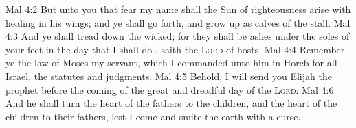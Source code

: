 \vs Mal 4:2 But unto you that fear my name shall the Sun of righteousness arise with healing in his wings; and ye shall go forth, and grow up as calves of the stall.
\vs Mal 4:3 And ye shall tread down the wicked; for they shall be ashes under the soles of your feet in the day that I shall do , saith the \textsc{Lord} of hosts.
\vs Mal 4:4 Remember ye the law of Moses my servant, which I commanded unto him in Horeb for all Israel,  the statutes and judgments.
\vs Mal 4:5 Behold, I will send you Elijah the prophet before the coming of the great and dreadful day of the \textsc{Lord}:
\vs Mal 4:6 And he shall turn the heart of the fathers to the children, and the heart of the children to their fathers, lest I come and smite the earth with a curse.
